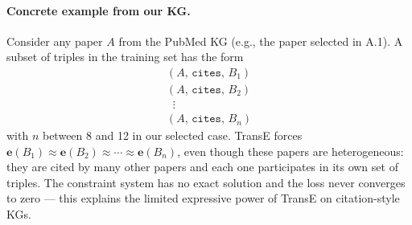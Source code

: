 \documentclass{article}
\begin{document}
\paragraph{Concrete example from our KG.}
Consider any paper $A$ from the PubMed KG (e.g., the paper selected in A.1).
A subset of triples in the training set has the form
\begin{align}
    (A,\, \texttt{cites},\, B_1) \nonumber\\
    (A,\, \texttt{cites},\, B_2) \nonumber\\
    \;\;\vdots\;\;            \nonumber\\
    (A,\, \texttt{cites},\, B_n) \label{eq:one-to-many-example}
\end{align}
with $n$ between 8 and 12 in our selected case. TransE forces
$\mathbf{e}(B_1) \approx \mathbf{e}(B_2) \approx \cdots \approx \mathbf{e}(B_n)$,
even though these papers are heterogeneous: they are cited by many other
papers and each one participates in its own set of triples. The constraint
system has no exact solution and the loss never converges to zero --- this
explains the limited expressive power of TransE on citation-style KGs.
\end{document}
